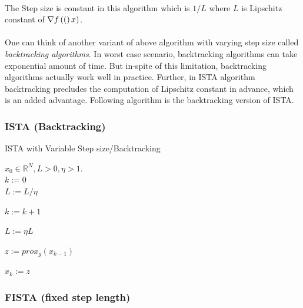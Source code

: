 \paragraph{}The Step size is constant in this algorithm which is $1/L$ where $L$ is Lipschitz constant of $\nabla f\left((\right)x)$. 

\paragraph{}One can think of another variant of above algorithm with varying step size called 
\emph{backtracking algorithms}. In worst case scenario, backtracking algorithms can take 
exponential amount of time. But in-spite of this limitation, backtracking algorithms actually 
work well in practice. Further, in ISTA algorithm backtracking precludes the computation of 
Lipschitz constant in advance, which is an added advantage. Following 
algorithm is the backtracking version of ISTA.
\vspace{2mm}

\subsubsection{ ISTA (Backtracking) }
\vspace{1.3mm}
 \begin{algorithm}
  \caption{ISTA with Variable Step size/Backtracking} \label{ista_b}
  \begin{algorithmic}
   \Require $x_0 \in \mathbb{R}^N, L > 0, \eta > 1$.\\
   $k := 0$\\

   $L := L / \eta$

   \Repeat

    $k := k + 1$

    \Repeat

     $L := \eta L$

     $z := prox_{g}( x_{k-1} )$


    $x_{k} := z$
  \end{algorithmic}
 \end{algorithm}
\vspace{1.3mm}


\subsubsection{ FISTA (fixed step length) }

